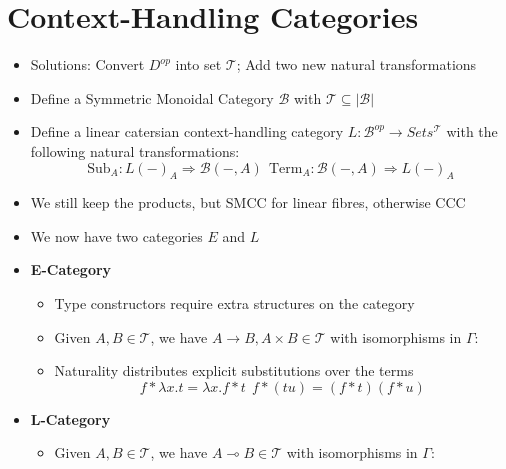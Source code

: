 \documentclass[11pt]{article}
\begin{document}
\section{Context-Handling Categories}
\begin{itemize}
    \item Solutions: Convert $D^{op}$ into set $\mathcal{T}$; Add two new natural transformations
    \item Define a Symmetric Monoidal Category $\mathcal{B}$ with $\mathcal{T} \subseteq |\mathcal{B}|$
    \item Define a linear catersian context-handling category $L: \mathcal{B}^{op} \to Sets^{\mathcal{T}}$ with the following natural transformations:
    \[ \text{Sub}_A : L(-)_A \Rightarrow \mathcal{B}(-, A) \ \ \text{Term}_A: \mathcal{B}(-, A) \Rightarrow L(-)_A\]
    \item We still keep the products, but SMCC for linear fibres, otherwise CCC
    \item We now have two categories $E$ and $L$
    \item \textbf{E-Category}
        \begin{itemize}
            \item Type constructors require extra structures on the category
            \item Given $A, B \in \mathcal{T}$, we have $A \to B, A \times B \in \mathcal{T}$
                  with isomorphisms in $\Gamma$:
            \item Naturality distributes explicit substitutions over the terms
                  \[f \ast \lambda x.t = \lambda x.f \ast t \ \ f \ast (tu) = (f \ast t)(f \ast u)\]
        \end{itemize}
    \item \textbf{L-Category}
        \begin{itemize}
            \item Given $A, B \in \mathcal{T}$, we have $A \multimap  B\in \mathcal{T}$
                with isomorphisms in $\Gamma$:
                \begin{mathpar}
                \end{mathpar}

\end{itemize}
\end{itemize}
\end{document}
